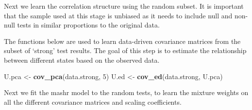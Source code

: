 \documentclass[
]{article}
\newenvironment{Shaded}{\begin{snugshade}}{\end{snugshade}}
\newcommand{\AttributeTok}[1]{\textcolor[rgb]{0.13,0.29,0.53}{#1}}
\newcommand{\DecValTok}[1]{\textcolor[rgb]{0.00,0.00,0.81}{#1}}
\newcommand{\FunctionTok}[1]{\textcolor[rgb]{0.13,0.29,0.53}{\textbf{#1}}}
\newcommand{\NormalTok}[1]{#1}
\newcommand{\OtherTok}[1]{\textcolor[rgb]{0.56,0.35,0.01}{#1}}
\newcommand{\SpecialCharTok}[1]{\textcolor[rgb]{0.81,0.36,0.00}{\textbf{#1}}}
\begin{document}
\normalsize

Next we learn the correlation structure using the random subset. It is
important that the sample used at this stage is unbiased as it needs to
include null and non-null tests in similar proportions to the original
data.

\footnotesize

\begin{Shaded}
\end{Shaded}

\normalsize

The functions below are used to learn data-driven covariance matrices
from the subset of `strong' test results. The goal of this step is to
estimate the relationship between different states based on the observed
data.

\footnotesize

\begin{Shaded}
\begin{Highlighting}[]
\NormalTok{U.pca }\OtherTok{\textless{}{-}} \FunctionTok{cov\_pca}\NormalTok{(data.strong, }\DecValTok{5}\NormalTok{)}
\NormalTok{U.ed }\OtherTok{\textless{}{-}} \FunctionTok{cov\_ed}\NormalTok{(data.strong, U.pca)}
\end{Highlighting}
\end{Shaded}

\normalsize

Next we fit the mashr model to the random tests, to learn the mixture
weights on all the different covariance matrices and scaling
coefficients.
\end{document}
